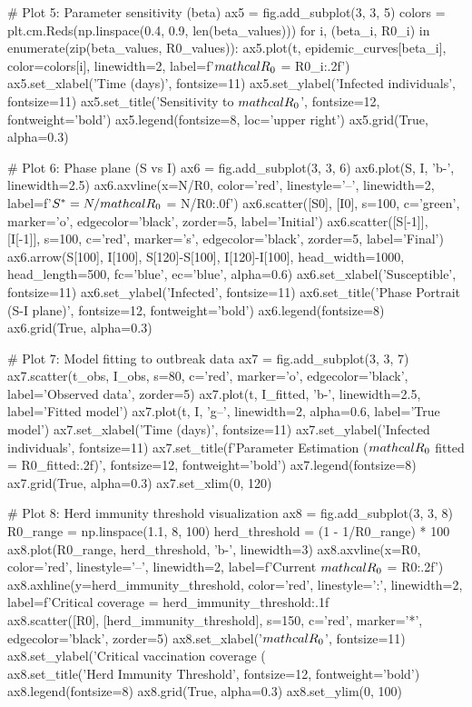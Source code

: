 \documentclass[a4paper, 11pt]{article}
\begin{document}
\begin{pycode}
# Plot 5: Parameter sensitivity (beta)
ax5 = fig.add_subplot(3, 3, 5)
colors = plt.cm.Reds(np.linspace(0.4, 0.9, len(beta_values)))
for i, (beta_i, R0_i) in enumerate(zip(beta_values, R0_values)):
    ax5.plot(t, epidemic_curves[beta_i], color=colors[i], linewidth=2,
             label=f'$\\mathcal{{R}}_0$ = {R0_i:.2f}')
ax5.set_xlabel('Time (days)', fontsize=11)
ax5.set_ylabel('Infected individuals', fontsize=11)
ax5.set_title('Sensitivity to $\\mathcal{R}_0$', fontsize=12, fontweight='bold')
ax5.legend(fontsize=8, loc='upper right')
ax5.grid(True, alpha=0.3)

# Plot 6: Phase plane (S vs I)
ax6 = fig.add_subplot(3, 3, 6)
ax6.plot(S, I, 'b-', linewidth=2.5)
ax6.axvline(x=N/R0, color='red', linestyle='--', linewidth=2,
            label=f'$S^* = N/\\mathcal{{R}}_0$ = {N/R0:.0f}')
ax6.scatter([S0], [I0], s=100, c='green', marker='o', edgecolor='black',
            zorder=5, label='Initial')
ax6.scatter([S[-1]], [I[-1]], s=100, c='red', marker='s', edgecolor='black',
            zorder=5, label='Final')
ax6.arrow(S[100], I[100], S[120]-S[100], I[120]-I[100],
          head_width=1000, head_length=500, fc='blue', ec='blue', alpha=0.6)
ax6.set_xlabel('Susceptible', fontsize=11)
ax6.set_ylabel('Infected', fontsize=11)
ax6.set_title('Phase Portrait (S-I plane)', fontsize=12, fontweight='bold')
ax6.legend(fontsize=8)
ax6.grid(True, alpha=0.3)

# Plot 7: Model fitting to outbreak data
ax7 = fig.add_subplot(3, 3, 7)
ax7.scatter(t_obs, I_obs, s=80, c='red', marker='o', edgecolor='black',
            label='Observed data', zorder=5)
ax7.plot(t, I_fitted, 'b-', linewidth=2.5, label='Fitted model')
ax7.plot(t, I, 'g--', linewidth=2, alpha=0.6, label='True model')
ax7.set_xlabel('Time (days)', fontsize=11)
ax7.set_ylabel('Infected individuals', fontsize=11)
ax7.set_title(f'Parameter Estimation ($\\mathcal{{R}}_0$ fitted = {R0_fitted:.2f})',
              fontsize=12, fontweight='bold')
ax7.legend(fontsize=8)
ax7.grid(True, alpha=0.3)
ax7.set_xlim(0, 120)

# Plot 8: Herd immunity threshold visualization
ax8 = fig.add_subplot(3, 3, 8)
R0_range = np.linspace(1.1, 8, 100)
herd_threshold = (1 - 1/R0_range) * 100
ax8.plot(R0_range, herd_threshold, 'b-', linewidth=3)
ax8.axvline(x=R0, color='red', linestyle='--', linewidth=2,
            label=f'Current $\\mathcal{{R}}_0$ = {R0:.2f}')
ax8.axhline(y=herd_immunity_threshold, color='red', linestyle=':', linewidth=2,
            label=f'Critical coverage = {herd_immunity_threshold:.1f}\\%
ax8.scatter([R0], [herd_immunity_threshold], s=150, c='red', marker='*',
            edgecolor='black', zorder=5)
ax8.set_xlabel('$\\mathcal{R}_0$', fontsize=11)
ax8.set_ylabel('Critical vaccination coverage (\\%
ax8.set_title('Herd Immunity Threshold', fontsize=12, fontweight='bold')
ax8.legend(fontsize=8)
ax8.grid(True, alpha=0.3)
ax8.set_ylim(0, 100)


\end{pycode}
\end{document}
